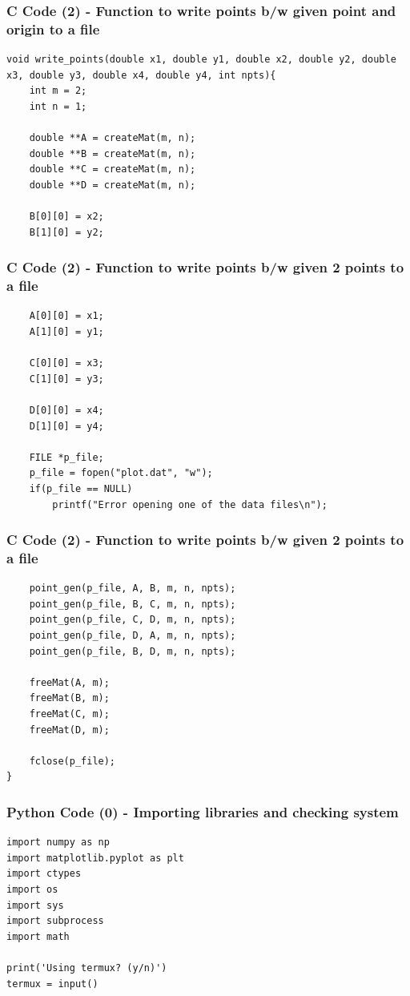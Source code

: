 \documentclass{beamer}
\begin{document}
\begin{frame}[fragile]
    \frametitle{C Code (2) - Function to write points b/w given point and origin to a file}

    \begin{lstlisting}
void write_points(double x1, double y1, double x2, double y2, double x3, double y3, double x4, double y4, int npts){
    int m = 2;
    int n = 1;

    double **A = createMat(m, n);
    double **B = createMat(m, n);
    double **C = createMat(m, n);
    double **D = createMat(m, n);

    B[0][0] = x2;
    B[1][0] = y2;
    \end{lstlisting}
\end{frame}
\begin{frame}[fragile]
    \frametitle{C Code (2) - Function to write points b/w given 2 points to a file}

    \begin{lstlisting}
    A[0][0] = x1;
    A[1][0] = y1;

    C[0][0] = x3;
    C[1][0] = y3;

    D[0][0] = x4;
    D[1][0] = y4;

    FILE *p_file;
    p_file = fopen("plot.dat", "w");
    if(p_file == NULL)
        printf("Error opening one of the data files\n");
    \end{lstlisting}
\end{frame}

\begin{frame}[fragile]
    \frametitle{C Code (2) - Function to write points b/w given 2 points to a file}
    \begin{lstlisting}
    point_gen(p_file, A, B, m, n, npts);
    point_gen(p_file, B, C, m, n, npts);
    point_gen(p_file, C, D, m, n, npts);
    point_gen(p_file, D, A, m, n, npts);
    point_gen(p_file, B, D, m, n, npts);

    freeMat(A, m);
    freeMat(B, m);
    freeMat(C, m);
    freeMat(D, m);

    fclose(p_file);
}
    \end{lstlisting}
\end{frame}

\begin{frame}[fragile]
    \frametitle{Python Code (0) - Importing libraries and checking system}
    \begin{lstlisting}
import numpy as np
import matplotlib.pyplot as plt
import ctypes
import os
import sys
import subprocess
import math

print('Using termux? (y/n)')
termux = input()
\end{lstlisting}
\end{frame}
\end{document}
